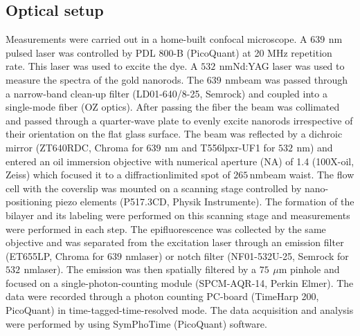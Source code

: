 \documentclass[journal=jpccck,manuscript=article]{achemso}
\newcommand{\nm}{\ensuremath{\,\textrm{nm}}}
\newcommand{\um}{\ensuremath{\,\mu\textrm{m}}}
\begin{document}
\subsection{Optical setup}
Measurements were carried out in a home-built confocal microscope. A $639~$\nm pulsed laser was controlled by 
PDL 800-B (PicoQuant) at 20 MHz repetition rate. This laser was used to excite the dye. A $532~$\nm Nd:YAG laser 
was used to measure the spectra of the gold nanorods. The $639~$\nm beam was passed through a narrow-band clean-up 
filter (LD01-640/8-25, Semrock) and coupled into a single-mode fiber (OZ optics). After passing the fiber the 
beam was collimated and passed through a quarter-wave plate to evenly excite nanorods irrespective of their 
orientation on the flat glass surface. The beam was reflected by a dichroic mirror (ZT640RDC, Chroma for $639~$\nm 
and T556lpxr-UF1 for $532~$\nm) and entered an oil immersion objective with numerical aperture (NA) 
of 1.4 (100X-oil, Zeiss) which focused it to a diffractionlimited spot of $265$\nm beam waist. The flow cell with 
the coverslip was mounted on a scanning stage controlled by nano-positioning piezo 
elements (P517.3CD, Physik Instrumente). The formation of the bilayer and its labeling were performed on this 
scanning stage and measurements were performed in each step. The epifluorescence was collected by the same objective 
and was separated from the excitation laser through an emission filter (ET655LP, Chroma for $639~$\nm laser) or 
notch filter (NF01-532U-25, Semrock for $532~$\nm laser). The emission was then spatially filtered by a $75~$\um 
pinhole and focused on a single-photon-counting module (SPCM-AQR-14, Perkin Elmer). The data were recorded through 
a photon counting PC-board (TimeHarp 200, PicoQuant) in time-tagged-time-resolved mode. The data acquisition and 
analysis were performed by using SymPhoTime (PicoQuant) software.
\end{document}

